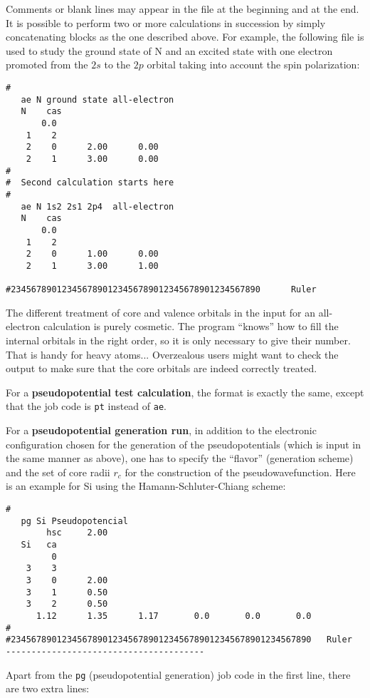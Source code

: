 \documentclass[11pt]{article}
\begin{document}
Comments or blank lines may appear in the file at the beginning and at the end.
It is possible to perform two or more calculations in
succession by simply concatenating blocks as the one described above.
For example, the following file is used to study the ground state of N
and an excited state with one electron promoted from the $2s$ to the $2p$
orbital taking into account the spin polarization:

\begin{verbatim}
#
   ae N ground state all-electron
   N    cas
       0.0
    1    2
    2    0      2.00      0.00
    2    1      3.00      0.00
#
#  Second calculation starts here
#
   ae N 1s2 2s1 2p4  all-electron
   N    cas
       0.0
    1    2
    2    0      1.00      0.00
    2    1      3.00      1.00

#2345678901234567890123456789012345678901234567890      Ruler
\end{verbatim}

	
The different treatment of core and valence orbitals in the input for an
all-electron calculation is purely cosmetic. The program ``knows'' how
to fill the internal orbitals in the right order, so it is only
necessary to give their number. That is handy for heavy atoms...
Overzealous users might want to check the output to make sure that the
core orbitals are indeed correctly treated.



For a {\bf pseudopotential test calculation}, the format is exactly
the same, except that the job code is {\tt pt} instead of {\tt ae}. 


For a {\bf pseudopotential generation run}, in addition to the
electronic configuration chosen for the generation of the
pseudopotentials (which is input in the same manner as above), one has
to specify the ``flavor'' (generation scheme) and the set of core
radii $r_c$ for the construction of the pseudowavefunction. Here is an
example for Si using the Hamann-Schluter-Chiang scheme:

\begin{verbatim}
# 
   pg Si Pseudopotencial
        hsc     2.00
   Si   ca
         0
    3    3
    3    0      2.00
    3    1      0.50
    3    2      0.50
      1.12      1.35      1.17       0.0       0.0       0.0
#
#23456789012345678901234567890123456789012345678901234567890   Ruler
---------------------------------------
\end{verbatim}

Apart from the {\tt pg} (pseudopotential generation) job code in the
first line, there are two extra lines:
\end{document}

